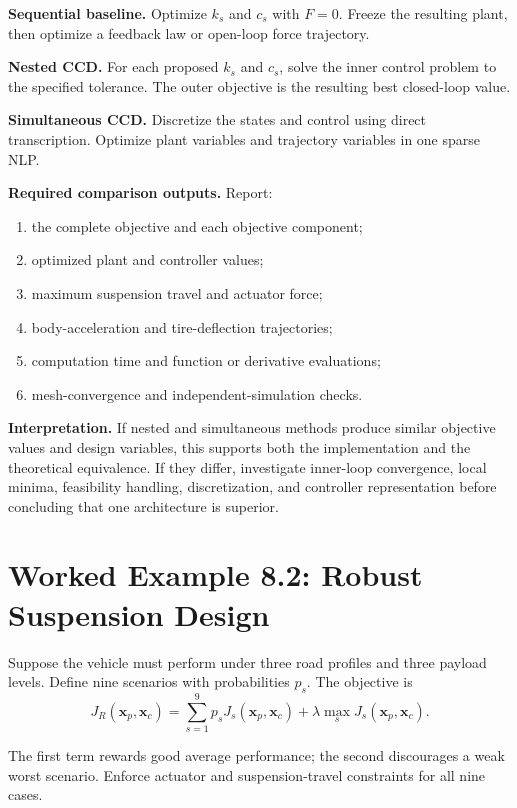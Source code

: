 \documentclass[11pt]{article}
\newcommand{\vect}[1]{\boldsymbol{#1}}
\newcommand{\xp}{\vect{x}_p}
\newcommand{\xc}{\vect{x}_c}
\begin{document}
\textbf{Sequential baseline.}
Optimize $k_s$ and $c_s$ with $F=0$. Freeze the resulting plant, then optimize a feedback law or open-loop force trajectory.

\textbf{Nested CCD.}
For each proposed $k_s$ and $c_s$, solve the inner control problem to the specified tolerance. The outer objective is the resulting best closed-loop value.

\textbf{Simultaneous CCD.}
Discretize the states and control using direct transcription. Optimize plant variables and trajectory variables in one sparse NLP.

\textbf{Required comparison outputs.}
Report:
\begin{enumerate}[leftmargin=1.5em]
  \item the complete objective and each objective component;
  \item optimized plant and controller values;
  \item maximum suspension travel and actuator force;
  \item body-acceleration and tire-deflection trajectories;
  \item computation time and function or derivative evaluations;
  \item mesh-convergence and independent-simulation checks.
\end{enumerate}

\textbf{Interpretation.}
If nested and simultaneous methods produce similar objective values and design variables, this supports both the implementation and the theoretical equivalence. If they differ, investigate inner-loop convergence, local minima, feasibility handling, discretization, and controller representation before concluding that one architecture is superior.

\section{Worked Example 8.2: Robust Suspension Design}

Suppose the vehicle must perform under three road profiles and three payload levels. Define nine scenarios with probabilities $p_s$. The objective is
\begin{equation}
J_R(\xp,\xc)=\sum_{s=1}^{9}p_sJ_s(\xp,\xc)+\lambda\max_s J_s(\xp,\xc).
\end{equation}

The first term rewards good average performance; the second discourages a weak worst scenario. Enforce actuator and suspension-travel constraints for all nine cases.
\end{document}
